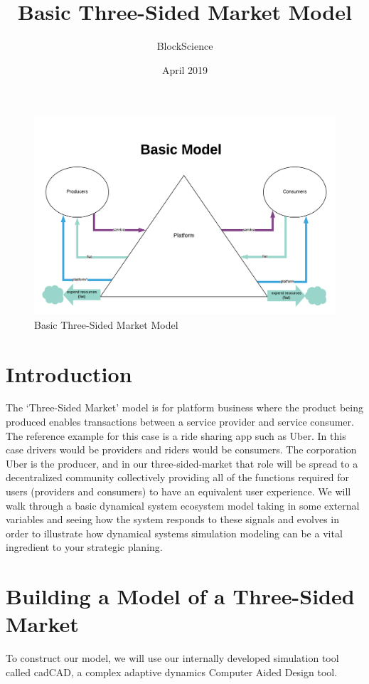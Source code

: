 \documentclass[12pt]{extarticle}
\title{Basic Three-Sided Market Model}
\author{BlockScience}
\date{April 2019}
\begin{document}
\maketitle

\begin{figure}
    \centering
    \includegraphics[width=1\textwidth]{images/3SidedMarketBasicDemo.png}
    \caption{Basic Three-Sided Market Model}
\end{figure}

\section{Introduction}

The ‘Three-Sided Market’ model is for platform business where the product being produced enables transactions between a service provider and service consumer. The reference example for this case is a ride sharing app such as Uber. In this case drivers would be providers and riders would be consumers. The corporation Uber is the producer, and in our three-sided-market that role will be spread to a decentralized community collectively providing all of the functions required for users (providers and consumers) to have an equivalent user experience. We will walk through a basic dynamical system ecosystem model taking in some external variables and seeing how the system responds to these signals and evolves in order to illustrate how dynamical systems simulation modeling can be a vital ingredient to your strategic planing.

\section{Building a Model of a Three-Sided Market}
To construct our model, we will use our internally developed simulation tool called cadCAD, a complex adaptive dynamics Computer Aided Design tool. \\
\end{document}
